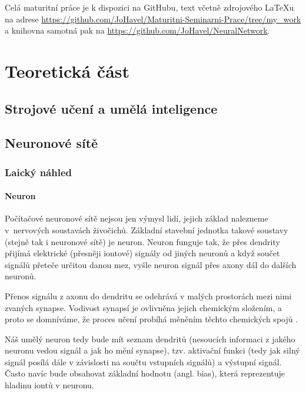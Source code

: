 \documentclass[12pt]{report}			%
\begin{document}
		Celá maturitní práce je k dispozici na GitHubu, text včetně zdrojového LaTeXu na adrese \url{https://github.com/JoHavel/Maturitni-Seminarni-Prace/tree/my\_work} a knihovna samotná pak na \url{https://github.com/JoHavel/NeuralNetwork}.
	
	
	\part{Teoretická část}
		
		\chapter{Strojové učení a umělá inteligence}
		
		\chapter{Neuronové sítě}
		
			\section{Laický náhled}
			
				\subsection{Neuron}
					Počítačové neuronové sítě nejsou jen výmysl lidí, jejich základ nalezneme v~nervových soustavách živočichů. Základní stavební jednotka takové soustavy (stejně tak i neuronové sítě) je neuron. Neuron funguje tak, že přes \gls{dendrit}y přijímá elektrické (přesněji iontové) signály od jiných neuronů a když součet signálů přeteče určitou danou mez, vyšle neuron signál přes \gls{axon}y dál do dalších neuronů.
					
					Přenos signálu z \gls{axon}u do \gls{dendrit}u se odehrává v malých prostorách mezi nimi zvaných \gls{synapse}. Vodivost synapsí je ovlivněna jejich chemickým složením, a proto se domníváme, že proces učení probíhá měněním těchto chemických spojů \autocite[s. 491]{Book:Informatika}.
					
					Náš umělý neuron tedy bude mít seznam \gls{dendrit}ů (nesoucích informaci z jakého neuronu vedou signál a jak ho mění \gls{synapse}), tzv. aktivační funkci (tedy jak silný signál posílá dále v závislosti na součtu vstupních signálů) a výstupní signál. Často navíc bude obsahovat základní hodnotu (angl. bias), která reprezentuje hladinu iontů v neuronu.
				
\end{document}
